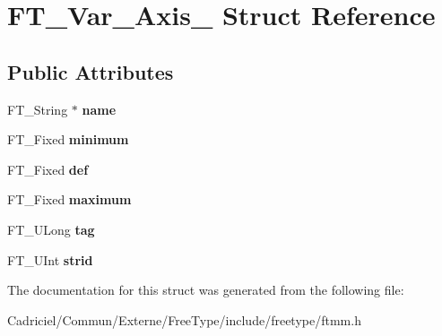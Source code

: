 \hypertarget{struct_f_t___var___axis__}{}\section{F\+T\+\_\+\+Var\+\_\+\+Axis\+\_\+ Struct Reference}
\label{struct_f_t___var___axis__}
\subsection*{Public Attributes}
\begin{DoxyCompactItemize}
\item 
F\+T\+\_\+\+String $\ast$ {\bfseries name}\hypertarget{struct_f_t___var___axis___a8d0e0af322a692999ec3733a3e18a5a4}{}\label{struct_f_t___var___axis___a8d0e0af322a692999ec3733a3e18a5a4}

\item 
F\+T\+\_\+\+Fixed {\bfseries minimum}\hypertarget{struct_f_t___var___axis___aae13a8dea1c96bc3949019e8117e7edb}{}\label{struct_f_t___var___axis___aae13a8dea1c96bc3949019e8117e7edb}

\item 
F\+T\+\_\+\+Fixed {\bfseries def}\hypertarget{struct_f_t___var___axis___a37a6ca4188a6bfd95d9d06538bf1a3dd}{}\label{struct_f_t___var___axis___a37a6ca4188a6bfd95d9d06538bf1a3dd}

\item 
F\+T\+\_\+\+Fixed {\bfseries maximum}\hypertarget{struct_f_t___var___axis___a5704641439e9f318cf3c2b73864e3260}{}\label{struct_f_t___var___axis___a5704641439e9f318cf3c2b73864e3260}

\item 
F\+T\+\_\+\+U\+Long {\bfseries tag}\hypertarget{struct_f_t___var___axis___a01ef9396e34e740c2d2b8c7117094624}{}\label{struct_f_t___var___axis___a01ef9396e34e740c2d2b8c7117094624}

\item 
F\+T\+\_\+\+U\+Int {\bfseries strid}\hypertarget{struct_f_t___var___axis___a297d28ab0f5666e56d7575249ccc75d7}{}\label{struct_f_t___var___axis___a297d28ab0f5666e56d7575249ccc75d7}

\end{DoxyCompactItemize}


The documentation for this struct was generated from the following file\+:\begin{DoxyCompactItemize}
\item 
Cadriciel/\+Commun/\+Externe/\+Free\+Type/include/freetype/ftmm.\+h\end{DoxyCompactItemize}
